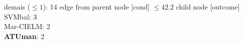 {{{{{%
demais ($\leq 1$): 14} edge from parent node [cond] {$\leq42.2$}}
child {node [outcome] {
SVMbal: 3\\
Mar-CIELM: 2\\
\textbf{ATUman}: 2\\
}}}}}

